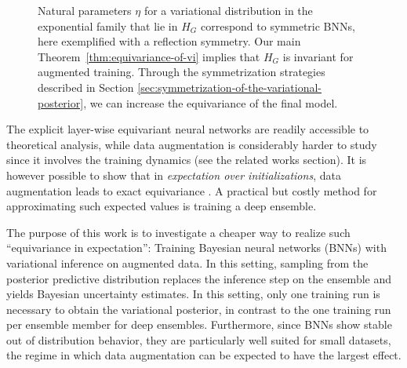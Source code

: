 \documentclass{article}
\begin{document}
\begin{figure}[b]
\centering
  
  \vspace{-0.6cm}
  \caption{Natural parameters $\eta$ for a variational distribution in the exponential family that lie in $H_G$ correspond to symmetric BNNs, here exemplified with a reflection symmetry. Our main Theorem~\ref{thm:equivariance-of-vi} implies that $H_G$ is invariant for augmented training. Through the symmetrization strategies described in Section \ref{sec:symmetrization-of-the-variational-posterior}, we can increase the equivariance of the final model.  }
  \label{fig:figureone}
\end{figure}
The explicit layer-wise
equivariant neural networks are readily accessible to theoretical analysis, while data augmentation is considerably harder to study since it involves the training dynamics (see the related works section).
It is however possible to show that in \emph{expectation over initializations}, data augmentation leads to exact equivariance \citep{gerken2024emergent,nordenfors2024}. A practical but costly method for approximating such expected values is training a deep ensemble.



The purpose of this work is to investigate a cheaper way to realize such ``equivariance in expectation'': Training Bayesian neural networks (BNNs) with variational inference on augmented data. In this setting, sampling from the posterior predictive distribution replaces the inference step on the ensemble and yields Bayesian uncertainty estimates. In this setting, only one training run is necessary to obtain the variational posterior, in contrast to the one training run per ensemble member
for deep ensembles. Furthermore, since BNNs show stable out of distribution behavior, they are particularly well suited for small datasets, the regime in which data augmentation can be expected to have the largest effect. 
\end{document}

